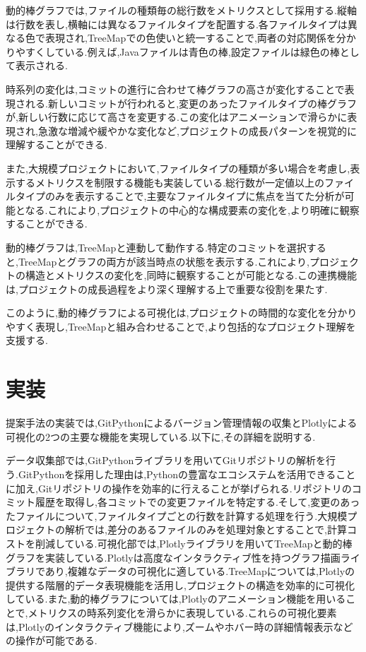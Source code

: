 \documentclass[12pt,twoside]{jbook}
\begin{document}
動的棒グラフでは,ファイルの種類毎の総行数をメトリクスとして採用する.縦軸は行数を表し,横軸には異なるファイルタイプを配置する.各ファイルタイプは異なる色で表現され,TreeMapでの色使いと統一することで,両者の対応関係を分かりやすくしている.例えば,Javaファイルは青色の棒,設定ファイルは緑色の棒として表示される.

時系列の変化は,コミットの進行に合わせて棒グラフの高さが変化することで表現される.新しいコミットが行われると,変更のあったファイルタイプの棒グラフが,新しい行数に応じて高さを変更する.この変化はアニメーションで滑らかに表現され,急激な増減や緩やかな変化など,プロジェクトの成長パターンを視覚的に理解することができる.

また,大規模プロジェクトにおいて,ファイルタイプの種類が多い場合を考慮し,表示するメトリクスを制限する機能も実装している.総行数が一定値以上のファイルタイプのみを表示することで,主要なファイルタイプに焦点を当てた分析が可能となる.これにより,プロジェクトの中心的な構成要素の変化を,より明確に観察することができる.

動的棒グラフは,TreeMapと連動して動作する.特定のコミットを選択すると,TreeMapとグラフの両方が該当時点の状態を表示する.これにより,プロジェクトの構造とメトリクスの変化を,同時に観察することが可能となる.この連携機能は,プロジェクトの成長過程をより深く理解する上で重要な役割を果たす.

このように,動的棒グラフによる可視化は,プロジェクトの時間的な変化を分かりやすく表現し,TreeMapと組み合わせることで,より包括的なプロジェクト理解を支援する.

\section{実装}
提案手法の実装では,GitPythonによるバージョン管理情報の収集とPlotlyによる可視化の2つの主要な機能を実現している.以下に,その詳細を説明する.

データ収集部では,GitPythonライブラリを用いてGitリポジトリの解析を行う.GitPythonを採用した理由は,Pythonの豊富なエコシステムを活用できることに加え,Gitリポジトリの操作を効率的に行えることが挙げられる.リポジトリのコミット履歴を取得し,各コミットでの変更ファイルを特定する.そして,変更のあったファイルについて,ファイルタイプごとの行数を計算する処理を行う.大規模プロジェクトの解析では,差分のあるファイルのみを処理対象とすることで,計算コストを削減している.可視化部では,Plotlyライブラリを用いてTreeMapと動的棒グラフを実装している.Plotlyは高度なインタラクティブ性を持つグラフ描画ライブラリであり,複雑なデータの可視化に適している.TreeMapについては,Plotlyの提供する階層的データ表現機能を活用し,プロジェクトの構造を効率的に可視化している.また,動的棒グラフについては,Plotlyのアニメーション機能を用いることで,メトリクスの時系列変化を滑らかに表現している.これらの可視化要素は,Plotlyのインタラクティブ機能により,ズームやホバー時の詳細情報表示などの操作が可能である.
\end{document}
